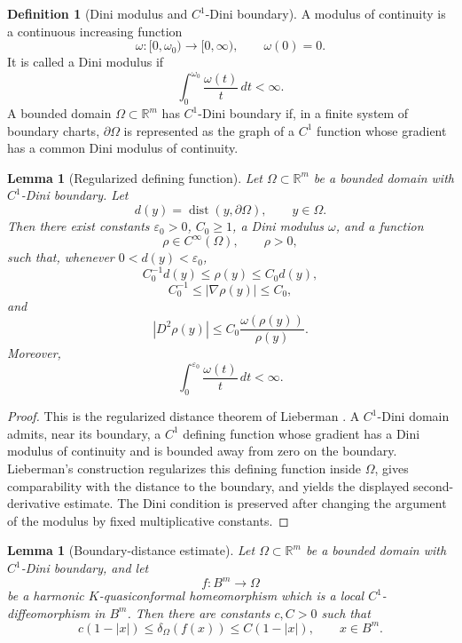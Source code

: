 \documentclass[11pt]{amsart}
\newtheorem{lemma}[theorem]{Lemma}
\theoremstyle{definition}
\newtheorem{definition}[theorem]{Definition}
\theoremstyle{remark}
\newcommand{\R}{\mathbb R}
\begin{document}
\begin{definition}[Dini modulus and \(C^1\)-Dini boundary]
\label{def:dini-boundary}
A modulus of continuity is a continuous increasing function
\[
        \omega:[0,\omega_0)\to[0,\infty),
        \qquad
        \omega(0)=0.
\]
It is called a Dini modulus if
\[
        \int_0^{\omega_0}\frac{\omega(t)}{t}\,dt<\infty .
\]
A bounded domain \(\Omega\subset\R^m\) has \(C^1\)-Dini boundary if, in a
finite system of boundary charts, \(\partial\Omega\) is represented as the
graph of a \(C^1\) function whose gradient has a common Dini modulus of
continuity.
\end{definition}

\begin{lemma}[Regularized defining function]
\label{lem:regularized-defining-function-dini}
Let \(\Omega\subset\R^m\) be a bounded domain with \(C^1\)-Dini boundary.
Let
\[
        d(y)=\operatorname{dist}(y,\partial\Omega),
        \qquad y\in\Omega .
\]
Then there exist constants \(\varepsilon_0>0\), \(C_0\ge1\), a Dini
modulus \(\omega\), and a function
\[
        \rho\in C^\infty(\Omega), \qquad \rho>0,
\]
such that, whenever \(0<d(y)<\varepsilon_0\),
\[
        C_0^{-1}d(y)\le \rho(y)\le C_0d(y),
\]
\[
        C_0^{-1}\le |\nabla\rho(y)|\le C_0,
\]
and
\[
        |D^2\rho(y)|
        \le
        C_0\frac{\omega(\rho(y))}{\rho(y)}.
\]
Moreover,
\[
        \int_0^{\varepsilon_0}\frac{\omega(t)}{t}\,dt<\infty .
\]
\end{lemma}

\begin{proof}
This is the regularized distance theorem of Lieberman
\cite{Lieberman1985}.  A \(C^1\)-Dini domain admits, near its boundary, a
\(C^1\) defining function whose gradient has a Dini modulus of continuity
and is bounded away from zero on the boundary.  Lieberman's construction
regularizes this defining function inside \(\Omega\), gives comparability
with the distance to the boundary, and yields the displayed second-derivative
estimate.  The Dini condition is preserved after changing the argument of the
modulus by fixed multiplicative constants.
\end{proof}

\begin{lemma}[Boundary-distance estimate]
\label{lem:boundary-distance-dini}
Let \(\Omega\subset\R^m\) be a bounded domain with \(C^1\)-Dini boundary,
and let
\[
        f:B^m\to\Omega
\]
be a harmonic \(K\)-quasiconformal homeomorphism which is a local
\(C^1\)-diffeomorphism in \(B^m\). Then there are constants \(c,C>0\) such
that
\[
        c(1-|x|)
        \le
        \delta_\Omega(f(x))
        \le
        C(1-|x|),
        \qquad x\in B^m .
\]
\end{lemma}
\end{document}
